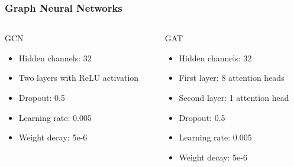 \documentclass[10pt, aspectratio = 169]{beamer}
\begin{document}
\begin{frame}
\begin{columns}[t]
\begin{column}{0.4\textwidth}
\begin{figure}
            \end{figure}
        \end{column}
    \end{columns}


\end{frame}

\begin{frame}
    \frametitle{Graph Neural Networks}
    \begin{columns}[t]
        \begin{column}{0.5\textwidth}
            \begin{block}{GCN}
                \begin{itemize}
                    \item Hidden channels: 32
                    \item Two layers with ReLU activation
                    \item Dropout: 0.5
                    \item Learning rate: 0.005
                    \item Weight decay: 5e-6
                \end{itemize}
            \end{block}
        \end{column}
        \begin{column}{0.5\textwidth}
            \begin{block}{GAT}
                \begin{itemize}
                    \item Hidden channels: 32
                    \item First layer: 8 attention heads
                    \item Second layer: 1 attention head
                    \item Dropout: 0.5
                    \item Learning rate: 0.005
                    \item Weight decay: 5e-6
                \end{itemize}
            \end{block}
        \end{column}
    \end{columns}
\end{frame}
\end{document}
